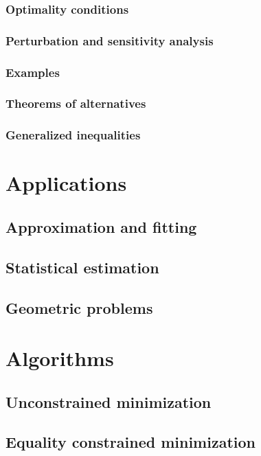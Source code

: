 \documentclass[11pt,oneside,a4paper]{book}
\theoremstyle{definition}
\DeclareRobustCommand{\[}{\begin{equation}}
\DeclareRobustCommand{\]}{\end{equation}}
\begin{document}
\section{Optimality conditions}

\section{Perturbation and sensitivity analysis}

\section{Examples}

\section{Theorems of alternatives}

\section{Generalized inequalities}

\part{Applications}

\chapter{Approximation and fitting}

\chapter{Statistical estimation}

\chapter{Geometric problems}

\part{Algorithms}

\chapter{Unconstrained minimization}

\chapter{Equality constrained minimization}
\end{document}
